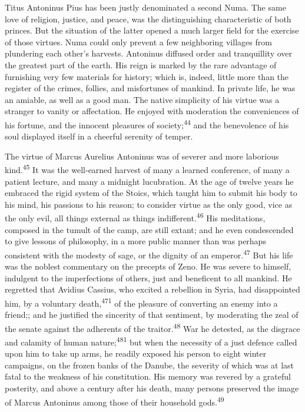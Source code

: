 
Titus Antoninus Pius has been justly denominated a second Numa.
The same love of religion, justice, and peace, was the
distinguishing characteristic of both princes. But the situation
of the latter opened a much larger field for the exercise of
those virtues. Numa could only prevent a few neighboring villages
from plundering each other’s harvests. Antoninus diffused order
and tranquillity over the greatest part of the earth. His reign
is marked by the rare advantage of furnishing very few materials
for history; which is, indeed, little more than the register of
the crimes, follies, and misfortunes of mankind. In private life,
he was an amiable, as well as a good man. The native simplicity
of his virtue was a stranger to vanity or affectation. He enjoyed
with moderation the conveniences of his fortune, and the innocent
pleasures of society;\textsuperscript{44} and the benevolence of his soul
displayed itself in a cheerful serenity of temper.


The virtue of Marcus Aurelius Antoninus was of severer and more
laborious kind.\textsuperscript{45} It was the well-earned harvest of many a
learned conference, of many a patient lecture, and many a
midnight lucubration. At the age of twelve years he embraced the
rigid system of the Stoics, which taught him to submit his body
to his mind, his passions to his reason; to consider virtue as
the only good, vice as the only evil, all things external as
things indifferent.\textsuperscript{46} His meditations, composed in the tumult of
the camp, are still extant; and he even condescended to give
lessons of philosophy, in a more public manner than was perhaps
consistent with the modesty of sage, or the dignity of an
emperor.\textsuperscript{47} But his life was the noblest commentary on the
precepts of Zeno. He was severe to himself, indulgent to the
imperfections of others, just and beneficent to all mankind. He
regretted that Avidius Cassius, who excited a rebellion in Syria,
had disappointed him, by a voluntary death,\textsuperscript{471} of the pleasure
of converting an enemy into a friend;; and he justified the
sincerity of that sentiment, by moderating the zeal of the senate
against the adherents of the traitor.\textsuperscript{48} War he detested, as the
disgrace and calamity of human nature;\textsuperscript{481} but when the necessity
of a just defence called upon him to take up arms, he readily
exposed his person to eight winter campaigns, on the frozen banks
of the Danube, the severity of which was at last fatal to the
weakness of his constitution. His memory was revered by a
grateful posterity, and above a century after his death, many
persons preserved the image of Marcus Antoninus among those of
their household gods.\textsuperscript{49}

